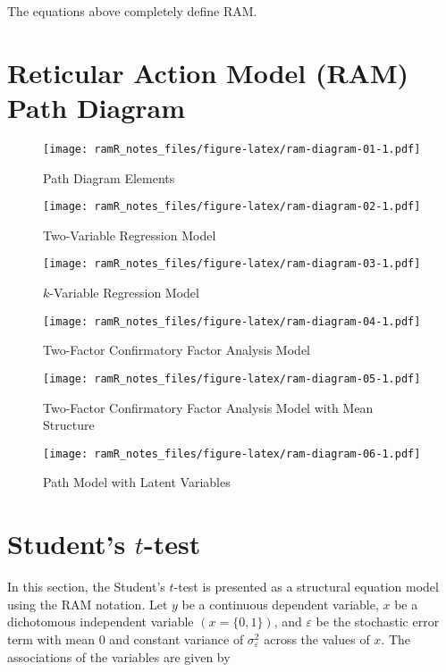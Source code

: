 \documentclass[
]{book}
\theoremstyle{definition}
\theoremstyle{definition}
\theoremstyle{definition}
\theoremstyle{remark}
\begin{document}
The equations above completely define RAM.

\hypertarget{ram-diagram}{%
\chapter{Reticular Action Model (RAM) Path Diagram}\label{ram-diagram}}

\begin{figure}
\centering
\texttt{[image: ramR\_notes\_files/figure-latex/ram-diagram-01-1.pdf]}
\caption{\label{fig:ram-diagram-01}Path Diagram Elements}
\end{figure}

\begin{figure}
\centering
\texttt{[image: ramR\_notes\_files/figure-latex/ram-diagram-02-1.pdf]}
\caption{\label{fig:ram-diagram-02}Two-Variable Regression Model}
\end{figure}

\begin{figure}
\centering
\texttt{[image: ramR\_notes\_files/figure-latex/ram-diagram-03-1.pdf]}
\caption{\label{fig:ram-diagram-03}\(k\)-Variable Regression Model}
\end{figure}

\begin{figure}
\centering
\texttt{[image: ramR\_notes\_files/figure-latex/ram-diagram-04-1.pdf]}
\caption{\label{fig:ram-diagram-04}Two-Factor Confirmatory Factor Analysis Model}
\end{figure}

\begin{figure}
\centering
\texttt{[image: ramR\_notes\_files/figure-latex/ram-diagram-05-1.pdf]}
\caption{\label{fig:ram-diagram-05}Two-Factor Confirmatory Factor Analysis Model with Mean Structure}
\end{figure}

\begin{figure}
\centering
\texttt{[image: ramR\_notes\_files/figure-latex/ram-diagram-06-1.pdf]}
\caption{\label{fig:ram-diagram-06}Path Model with Latent Variables}
\end{figure}

\hypertarget{ram-t}{%
\chapter{\texorpdfstring{Student's \(t\)-test}{Student's t-test}}\label{ram-t}}

In this section,
the Student's \(t\)-test is presented as a structural equation model
using the RAM notation.
Let \(y\) be a continuous dependent variable,
\(x\) be a dichotomous independent variable
\(\left( x = \{0, 1\} \right)\),
and \(\varepsilon\) be the stochastic error term
with mean 0 and constant variance of \(\sigma_{\varepsilon}^{2}\)
across the values of \(x\).
The associations of the variables are given by
\end{document}
